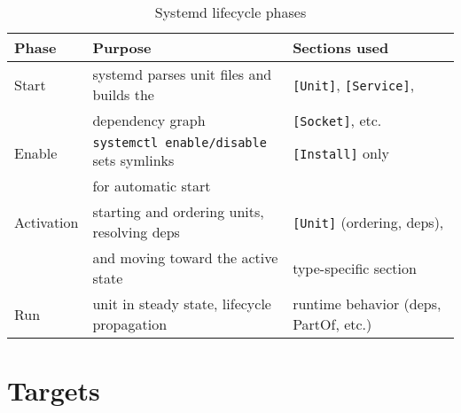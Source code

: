 \documentclass[openany, 12pt]{book}
\begin{document}
\begin{table}
  \begin{center}
    \begin{tabular}{lll}
      \toprule
      Phase      & Purpose                                         & Sections used                         \\
      \midrule
      Start      & systemd parses unit files and builds the        & \texttt{[Unit]}, \texttt{[Service]},  \\
                 & dependency graph                                & \texttt{[Socket]}, etc.               \\
      Enable     & \texttt{systemctl enable/disable} sets symlinks & \texttt{[Install]} only               \\
                 & for automatic start                             &                                       \\
      Activation & starting and ordering units, resolving deps     & \texttt{[Unit]} (ordering, deps),     \\
                 & and moving toward the active state              & type-specific section                 \\
      Run        & unit in steady state, lifecycle propagation     & runtime behavior (deps, PartOf, etc.) \\
      \bottomrule
    \end{tabular}
  \end{center}
  \caption{Systemd lifecycle phases}
\end{table}

\chapter{Targets}
\end{document}
